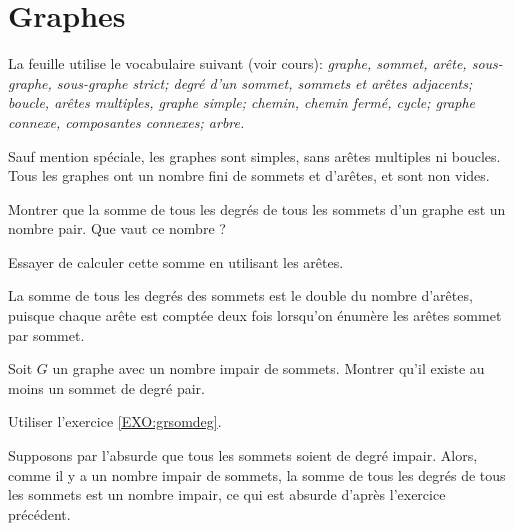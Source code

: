 

\chapter{Graphes}


La feuille utilise le vocabulaire suivant (voir cours): 
\emph{graphe, sommet, arête, sous-graphe, sous-graphe strict;
degré d'un sommet, sommets et arêtes adjacents; 
boucle, arêtes multiples, graphe simple; 
chemin, chemin fermé, cycle; 
graphe connexe, composantes connexes; arbre.}


Sauf mention spéciale, les graphes sont simples, sans arêtes multiples ni boucles. Tous les graphes ont un nombre fini de sommets et d'arêtes, et sont non vides.


\begin{exo}
\label{EXO:grsomdeg}
Montrer que la somme de tous les degrés de tous les sommets d'un graphe est un nombre pair. Que vaut ce nombre ?
\begin{hint}
Essayer de calculer cette somme en utilisant les arêtes.
\end{hint}
\begin{sol}
La somme de tous les degrés des sommets est le double du nombre d'arêtes, puisque chaque arête est comptée deux fois lorsqu'on énumère les arêtes sommet par sommet.
\end{sol}
\end{exo}

\begin{exo}
Soit $G$ un graphe avec un nombre impair de sommets. Montrer qu'il existe au moins un sommet de degré pair.
\begin{hint}
Utiliser l'exercice \ref{EXO:grsomdeg}.
\end{hint}
\begin{sol}
Supposons par l'absurde que tous les sommets soient de degré impair. Alors, comme il y a un nombre impair de sommets, la somme de tous les degrés de tous les sommets est un nombre impair, ce qui est absurde d'après l'exercice précédent.
\end{sol}
\end{exo}

